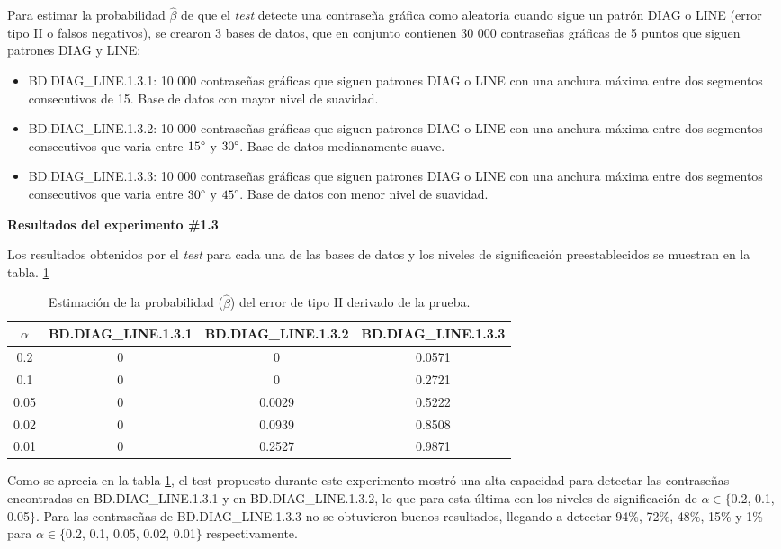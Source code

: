 \documentclass[12pt]{report}
\begin{document}
Para estimar la probabilidad $\hat{\beta}$ de que el \textit{test} detecte una contraseña gráfica como aleatoria cuando sigue un patrón DIAG o LINE  (error tipo II o falsos negativos), se crearon 3 bases de datos, que en conjunto contienen 30 000 contraseñas gráficas de 5 puntos que siguen patrones DIAG y LINE:
\begin{itemize}
	\item BD.DIAG\_LINE.1.3.1: 10 000 contraseñas gráficas que siguen patrones DIAG o LINE con una anchura máxima entre dos segmentos consecutivos de 15\degree. Base de datos con mayor nivel de suavidad. 
	\item BD.DIAG\_LINE.1.3.2: 10 000 contraseñas gráficas que siguen patrones DIAG o LINE con una anchura máxima entre dos segmentos consecutivos que varia entre $15\degree$ y $30\degree$. Base de datos medianamente suave.
	\item BD.DIAG\_LINE.1.3.3: 10 000 contraseñas gráficas que siguen patrones DIAG o LINE con una anchura máxima entre dos segmentos consecutivos que varia entre $30\degree$ y $45\degree$. Base de datos con menor nivel de suavidad.
\end{itemize}
\textbf{Resultados del experimento \#1.3}

Los resultados obtenidos por el \textit{test}  para cada una de las bases de datos y los  niveles de significación preestablecidos se muestran en la tabla. \ref{tab:error2-prob}

\begin{table}[h!]
	\centering
	\begin{tabular}{|c|ccc|}
		\hline
		 $\alpha$& BD.DIAG\_LINE.1.3.1 & BD.DIAG\_LINE.1.3.2 & BD.DIAG\_LINE.1.3.3  \\
		\hline
		0.2 & 0     & 0          & 0.0571     \\
		0.1 & 0     & 0          & 0.2721     \\
		0.05 & 0     & 0.0029    & 0.5222     \\
		0.02 & 0     & 0.0939    & 0.8508     \\
		0.01 & 0     & 0.2527    & 0.9871     \\
		\hline
	\end{tabular}
	\caption{Estimación de la probabilidad ($\hat{\beta}$) del error de tipo II derivado de la prueba.}
	\label{tab:error2-prob}
\end{table}
Como se aprecia en la tabla \ref{tab:error2-prob}, el test propuesto durante este experimento mostró una alta capacidad para detectar las contraseñas encontradas en BD.DIAG\_LINE.1.3.1 y en BD.DIAG\_LINE.1.3.2, lo que para esta última con los niveles de significación de $\alpha \in \{$0.2, 0.1, 0.05$\}$. Para las contraseñas de BD.DIAG\_LINE.1.3.3 no se obtuvieron buenos resultados, llegando a detectar 94\%, 72\%, 48\%, 15\% y 1\%  para $\alpha \in \{$0.2, 0.1, 0.05, 0.02, 0.01$\}$ respectivamente.
\end{document}
